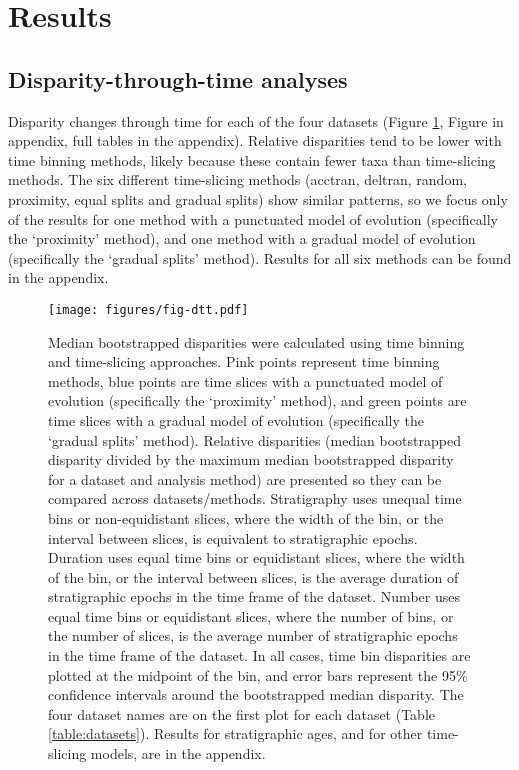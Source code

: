 \documentclass[12pt,a4paper]{article}
\begin{document}
\section{Results} 

\subsection{Disparity-through-time analyses}

Disparity changes through time for each of the four datasets (Figure \ref{figure:dtt}, Figure in appendix, full tables in the appendix). 
Relative disparities tend to be lower with time binning methods, likely because these contain fewer taxa than time-slicing methods.
The six different time-slicing methods (acctran, deltran, random, proximity, equal splits and gradual splits) show similar patterns, so we focus only of the results for one method with a punctuated model of evolution (specifically the `proximity' method), and one method with a gradual model of evolution (specifically the `gradual splits' method).
Results for all six methods can be found in the appendix. %

  \begin{figure}[!htbp]
    \centering
    \texttt{[image: figures/fig-dtt.pdf]}
    \caption[Relative disparity through time for four example datasets.]
    {Median bootstrapped disparities were calculated using time binning and time-slicing approaches. 
    Pink points represent time binning methods, blue points are time slices with a punctuated model of evolution (specifically the `proximity' method), and green points are time slices with a gradual model of evolution (specifically the `gradual splits' method).
    Relative disparities (median bootstrapped disparity divided by the maximum median bootstrapped disparity for a dataset and analysis method) are presented so they can be compared across datasets/methods. 
    Stratigraphy uses unequal time bins or non-equidistant slices, where the width of the bin, or the interval between slices, is equivalent to stratigraphic epochs. 
    Duration uses equal time bins or equidistant slices, where the width of the bin, or the interval between slices, is the average duration of stratigraphic epochs in the time frame of the dataset. 
    Number uses equal time bins or equidistant slices, where the number of bins, or the number of slices, is the average number of stratigraphic epochs in the time frame of the dataset. 
    In all cases, time bin disparities are plotted at the midpoint of the bin, and error bars represent the 95\% confidence intervals around the bootstrapped median disparity.
    The four dataset names are on the first plot for each dataset (Table \ref{table:datasets}).
    Results for stratigraphic ages, and for other time-slicing models, are in the appendix.}
    \label{figure:dtt}
  \end{figure}
\end{document}
